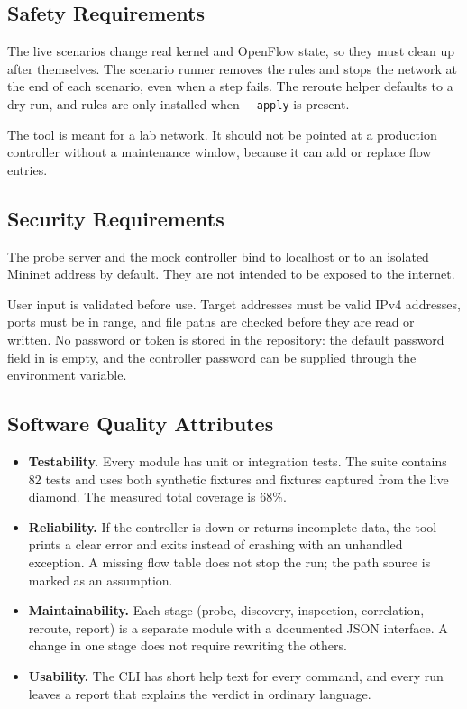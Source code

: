 \documentclass[11pt,a4paper]{article}
\newcommand{\code}[1]{\texttt{\detokenize{#1}}}
\begin{document}
\subsection{Safety Requirements}
The live scenarios change real kernel and OpenFlow state, so they must clean up after themselves. The scenario runner removes the \code{tc} rules and stops the network at the end of each scenario, even when a step fails. The reroute helper defaults to a dry run, and rules are only installed when \verb|--apply| is present.

The tool is meant for a lab network. It should not be pointed at a production controller without a maintenance window, because it can add or replace flow entries.

\subsection{Security Requirements}
The probe server and the mock controller bind to localhost or to an isolated Mininet address by default. They are not intended to be exposed to the internet.

User input is validated before use. Target addresses must be valid IPv4 addresses, ports must be in range, and file paths are checked before they are read or written. No password or token is stored in the repository: the default password field in \code{config.json} is empty, and the controller password can be supplied through the \code{CONTROLLER_PASSWORD} environment variable.

\subsection{Software Quality Attributes}
\begin{itemize}
  \item \textbf{Testability.} Every module has unit or integration tests. The suite contains 82 tests and uses both synthetic fixtures and fixtures captured from the live diamond. The measured total coverage is 68\%.
  \item \textbf{Reliability.} If the controller is down or returns incomplete data, the tool prints a clear error and exits instead of crashing with an unhandled exception. A missing flow table does not stop the run; the path source is marked as an assumption.
  \item \textbf{Maintainability.} Each stage (probe, discovery, inspection, correlation, reroute, report) is a separate module with a documented JSON interface. A change in one stage does not require rewriting the others.
  \item \textbf{Usability.} The CLI has short help text for every command, and every run leaves a report that explains the verdict in ordinary language.
\end{itemize}
\end{document}
